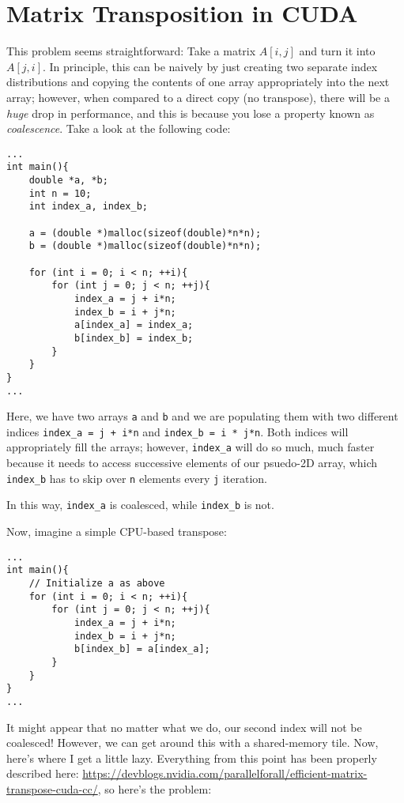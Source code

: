 \documentclass[11pt]{article}
\begin{document}
\section*{Matrix Transposition in CUDA}

This problem seems straightforward: Take a matrix $A[i,j]$ and turn it into $A[j,i]$. In principle, this can be naively by just creating two separate index distributions and copying the contents of one array appropriately into the next array; however, when compared to a direct copy (no transpose), there will be a \textit{huge} drop in performance, and this is because you lose a property known as \textit{coalescence}. Take a look at the following code:

\begin{lstlisting}
...
int main(){
    double *a, *b;
    int n = 10;
    int index_a, index_b;
    
    a = (double *)malloc(sizeof(double)*n*n);
    b = (double *)malloc(sizeof(double)*n*n);
    
    for (int i = 0; i < n; ++i){
        for (int j = 0; j < n; ++j){
            index_a = j + i*n;
            index_b = i + j*n;
            a[index_a] = index_a;
            b[index_b] = index_b;
        }
    }
}
...
\end{lstlisting}

Here, we have two arrays \lstinline{a} and \lstinline{b} and we are populating them with two different indices \lstinline{index_a = j + i*n} and \lstinline{index_b = i * j*n}. Both indices will appropriately fill the arrays; however, \lstinline{index_a} will do so much, much faster because it needs to access successive elements of our psuedo-2D array, which \lstinline{index_b} has to skip over \lstinline{n} elements every \lstinline{j} iteration.

In this way, \lstinline{index_a} is coalesced, while \lstinline{index_b} is not.

Now, imagine a simple CPU-based transpose:

\begin{lstlisting}
...
int main(){
    // Initialize a as above
    for (int i = 0; i < n; ++i){
        for (int j = 0; j < n; ++j){
            index_a = j + i*n;
            index_b = i + j*n;
            b[index_b] = a[index_a];
        }
    }
}
...
\end{lstlisting}

It might appear that no matter what we do, our second index will not be coalesced! However, we can get around this with a shared-memory tile. 
Now, here's where I get a little lazy. Everything from this point has been properly described here: \sloppy \url{https://devblogs.nvidia.com/parallelforall/efficient-matrix-transpose-cuda-cc/}, so here's the problem:
\end{document}
